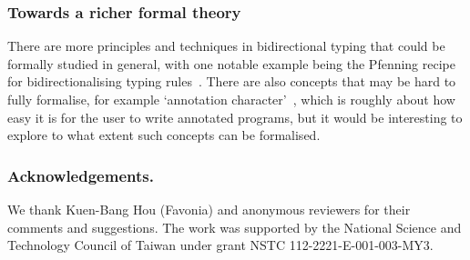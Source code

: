 \subsubsection{Towards a richer formal theory}

There are more principles and techniques in bidirectional typing that could be formally studied in general, with one notable example being the Pfenning recipe for bidirectionalising typing rules~\citep[Section~4]{Dunfield2021}.
There are also concepts that may be hard to fully formalise, for example `annotation character'~\citep[Section~3.4]{Dunfield2021}, which is roughly about how easy it is for the user to write annotated programs, but it would be interesting to explore to what extent such concepts can be formalised.

\begin{credits}
\subsubsection{Acknowledgements.}
We thank Kuen-Bang {Hou (Favonia)} and anonymous reviewers for their comments and suggestions.
The work was supported by the National Science and Technology Council of Taiwan under grant NSTC 112-2221-E-001-003-MY3.
\end{credits}
